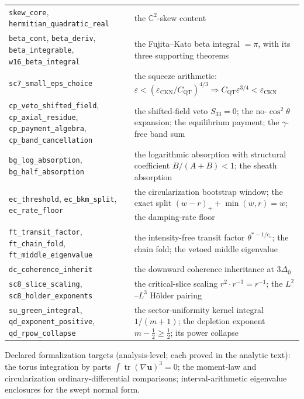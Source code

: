 \documentclass[11pt,letterpaper]{amsart}
\theoremstyle{definition}
\theoremstyle{remark}
\newcommand{\uu}{\boldsymbol{u}}
\begin{document}
{\begin{longtable}{@{}>{\raggedright\arraybackslash}p{}p{}@{}}
\texttt{skew\_core}, \texttt{hermitian\_quadratic\_real} & the
$\mathbb{C}^2$-skew content \\
\texttt{beta\_cont}, \texttt{beta\_deriv}, \texttt{beta\_integrable},
\texttt{w16\_beta\_integral} & the Fujita--Kato beta integral $=\pi$, with its three
supporting theorems \\
\texttt{sc7\_small\_eps\_choice} & the squeeze arithmetic:
$\varepsilon<(\varepsilon_{\mathrm{CKN}}/C_{\mathrm{QT}})^{4/3}\Rightarrow
C_{\mathrm{QT}}\varepsilon^{3/4}<\varepsilon_{\mathrm{CKN}}$ \\
\texttt{cp\_veto\_shifted\_field}, \texttt{cp\_axial\_residue},
\texttt{cp\_payment\_algebra}, \texttt{cp\_band\_cancellation} & the shifted-field
veto $S_{33}=0$; the no-$\cos^2\theta$ expansion; the equilibrium payment; the
$\gamma$-free band sum \\
\texttt{bg\_log\_absorption}, \texttt{bg\_half\_absorption} & the logarithmic
absorption with structural coefficient $B/(A{+}B)<1$; the sheath absorption \\
\texttt{ec\_threshold}, \texttt{ec\_bkm\_split}, \texttt{ec\_rate\_floor} & the
circularization bootstrap window; the exact split $(w{-}r)_++\min(w,r)=w$; the
damping-rate floor \\
\texttt{ft\_transit\_factor}, \texttt{ft\_chain\_fold},
\texttt{ft\_middle\_eigenvalue} & the intensity-free transit factor
$\theta^{*-1/c_o}$; the chain fold; the vetoed middle eigenvalue \\
\texttt{dc\_coherence\_inherit} & the downward coherence inheritance at $3\Delta_0$ \\
\texttt{sc8\_slice\_scaling}, \texttt{sc8\_holder\_exponents} & the critical-slice
scaling $r^2\cdot r^{-3}=r^{-1}$; the $L^2$--$L^3$ H\"older pairing \\
\texttt{su\_green\_integral}, \texttt{qd\_exponent\_positive},
\texttt{qd\_rpow\_collapse} & the sector-uniformity kernel integral $1/(m{+}1)$; the
depletion exponent $m-\tfrac12\ge\tfrac12$; its power collapse \\
\bottomrule
\end{longtable}}

Declared formalization targets (analysis-level; each proved in the analytic text): the
torus integration by parts $\int\operatorname{tr}(\nabla\uu)^3=0$; the moment-law and
circularization ordinary-differential comparisons; interval-arithmetic eigenvalue
enclosures for the swept normal form.

\end{document}
